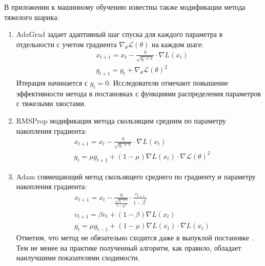 В приложении к машинному обучению известны также модификации метода тяжелого шарика:
\begin{enumerate}
    \item AdaGrad \cite{duchi2011adaptive} задает адаптивный шаг спуска для каждого параметра
    в отдельности с учетом градиента $\nabla_\theta \mathcal{L}(\theta)$ на каждом шаге:
        \begin{equation}
            \begin{aligned}
                &x_{t+1} = x_t - \frac{\eta}{\sqrt{g_t+\epsilon}} \cdot \nabla L(x_t) \\
                &g_{t+1} = g_t + \nabla_\theta \mathcal{L}(\theta)^2
            \end{aligned}
        \end{equation}
    Итерация начинается с $g_t=0$. Исследователи отмечают повышение эффективности метода в постановках с функциями распределения параметров 
    с тяжелыми хвостами.
    \item RMSProp \cite{krizhevsky2012imagenet} модификация метода скользящим средним по параметру накопления градиента:
        \begin{equation}
            \begin{aligned}
                &x_{t+1} = x_t - \frac{\eta}{\sqrt{g_t+\epsilon}} \cdot \nabla L(x_t) \\
                &g_t = \mu g_{t+1} + (1-\mu)\nabla L(x_t) \cdot \nabla \mathcal{L}(\theta)^2
            \end{aligned}
        \end{equation}
    \item Adam \cite{kingma2014adam} совмещающий метод скользящего среднего по градиенту и параметру накопления градиента:
        \begin{equation}
            \begin{aligned}
                &x_{t+1} = x_t - \frac{\eta}{\frac{\sqrt{g_t+\epsilon}}{1-\mu^t}} \cdot \frac{v_{t+1}}{1-\beta^t} \\
                &v_{t+1} = \beta v_t + (1-\beta) \nabla L(x_t) \\
                &g_t = \mu g_{t-1} + (1-\mu)\nabla L(x_t) \cdot \nabla  L(x_t)
            \end{aligned}
        \end{equation}
    Отметим, что метод не обязательно сходится даже в выпуклой постановке \cite{reddi2019convergence}. Тем не менее на практике полученный
    алгоритм, как правило, обладает наилучшими показателями сходимости.
\end{enumerate}


